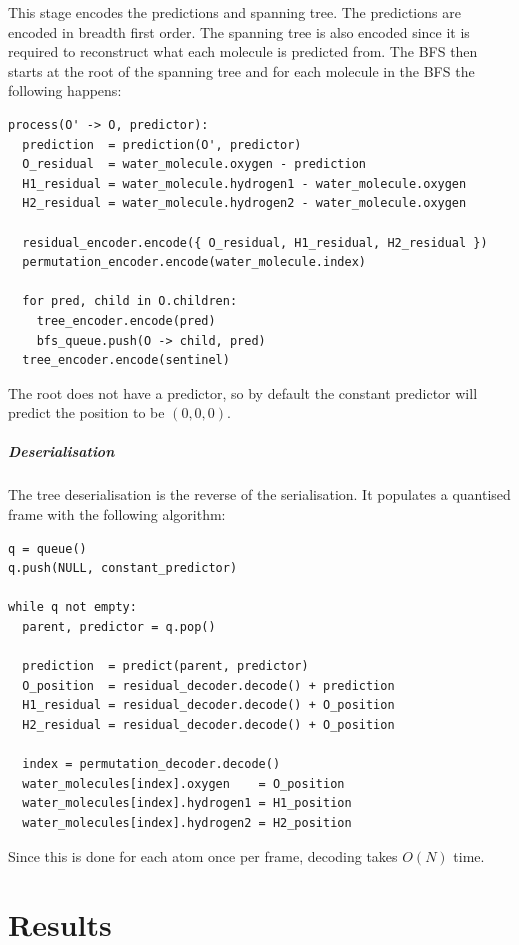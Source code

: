 \documentclass[a4paper]{report}
\begin{document}
This stage encodes the predictions and spanning tree. The predictions are
encoded in breadth first order. The spanning tree is also encoded since it is
required to reconstruct what each molecule is predicted from. The BFS then
starts at the root of the spanning tree and for each molecule in the BFS the
following happens:

\begin{verbatim}
process(O' -> O, predictor):
  prediction  = prediction(O', predictor)
  O_residual  = water_molecule.oxygen - prediction
  H1_residual = water_molecule.hydrogen1 - water_molecule.oxygen
  H2_residual = water_molecule.hydrogen2 - water_molecule.oxygen

  residual_encoder.encode({ O_residual, H1_residual, H2_residual })
  permutation_encoder.encode(water_molecule.index)

  for pred, child in O.children:
    tree_encoder.encode(pred)
    bfs_queue.push(O -> child, pred)
  tree_encoder.encode(sentinel)
\end{verbatim}

The root does not have a predictor, so by default the constant predictor will
predict the position to be $(0,0,0)$.


\paragraph{Deserialisation}

The tree deserialisation is the reverse of the serialisation. It populates a
quantised frame with the following algorithm:

\begin{verbatim}
q = queue()
q.push(NULL, constant_predictor)

while q not empty:
  parent, predictor = q.pop()

  prediction  = predict(parent, predictor)
  O_position  = residual_decoder.decode() + prediction
  H1_residual = residual_decoder.decode() + O_position
  H2_residual = residual_decoder.decode() + O_position

  index = permutation_decoder.decode()
  water_molecules[index].oxygen    = O_position
  water_molecules[index].hydrogen1 = H1_position
  water_molecules[index].hydrogen2 = H2_position
\end{verbatim}

Since this is done for each atom once per frame, decoding takes $O(N)$ time.


\chapter{Results}
\end{document}
